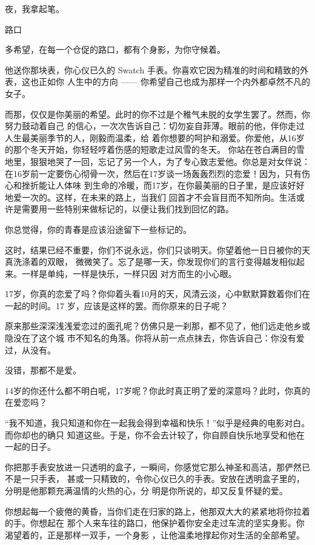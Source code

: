 \documentclass[12pt,a4paper]{article}
\def\blankrev{\vspace{1ex}}									%
\newcommand{\subpart}[1]{
	\begingroup \par
	\vspace{1ex} \centering #1
	\par \endgroup \nopagebreak[4]
}
\begin{document}
	\endwriting



		夜，我拿起笔。

		\subpart{路口}
		多希望，在每一个仓促的路口，都有个身影，为你守候着。

		\blankrev
		他送你那块表，你心仪已久的 Swatch 手表。你喜欢它因为精准的时间和精致的外表，这也正如你
	人生中的方向 —— 你希望自己也成为那样一个内外都卓然不凡的女子。

		而那，仅仅是你美丽的希望。此时的你不过是个稚气未脱的女学生罢了。然而，你努力鼓动着自己
	的信心，一次次告诉自己：切勿妄自菲薄。眼前的他，伴你走过人生最美丽季节的人，刚毅而温柔，给
	着你想要的呵护和溺爱。你爱他，从16岁的那个冬天开始，你轻轻哼着伤感的短歌走过风雪的冬天。
	你站在苍白满目的雪地里，狠狠地哭了一回，忘记了另一个人，为了专心致志爱他。你总是对女伴说：
	在16岁前一定要伤心彻骨一次，然后在17岁谈一场轰轰烈烈的恋爱！因为，只有伤心和挫折能让人体味
	到生命的冷暖，而17岁，在你最美丽的日子里，是应该好好地爱一次的。这样，在未来的路上，当我们
	回首才不会盲目而不知所向。生活或许是需要用一些特别来做标记的，以便让我们找到回忆的路。

		你总觉得，你的青春是应该沿途留下一些标记的。

		这时，结果已经不重要，你们不说永远，你们只谈明天。你望着他一日日被你的天真洗涤着的双眼，
	微微笑了。忘了是哪一天，你发现你们的言行变得越发相似起来。一样是单纯，一样是快乐，一样只因
	对方而生的小心眼。

		17岁，你真的恋爱了吗？你仰着头看10月的天，风清云淡，心中默默算数着你们在一起的时间。17
	岁，应该是这样的罢。而你原来的日子呢？

		原来那些深深浅浅爱恋过的面孔呢？仿佛只是一刹那，都不见了，他们远走他乡或隐没在了这个城
	市不知名的角落。你将从前一点点抹去，你告诉自己：你没有爱过，从没有。

		没错，那都不是爱。

		14岁的你还什么都不明白呢，17岁呢？你此时真正明了爱的深意吗？此时，你真的在爱恋吗？

		“我不知道，我只知道和你在一起我会得到幸福和快乐！”似乎是经典的电影对白。而你却也的确只
	知道这些。于是，你不会去计较了，你自顾自快乐地享受和他在一起的日子。

		你把那手表安放进一只透明的盒子，一瞬间，你感觉它那么神圣和高洁，那俨然已不是一只手表，
	甚或一只精致的，令你心仪已久的手表。安放在透明盒子里的，分明是他那颗充满温情的火热的心，分
	明是你所说的，却又反复怀疑的爱。

		你想起每一个疲倦的黄昏，当你们走在归家的路上，他那双大大的紧紧地将你拉着的手。你想起在
	那个人来车往的路口，他保护着你安全走过车流的坚实身影。你渴望着的，正是那样一双手，一个身影
	，让他温柔地撑起你对生活的全部希望。
\end{document}
